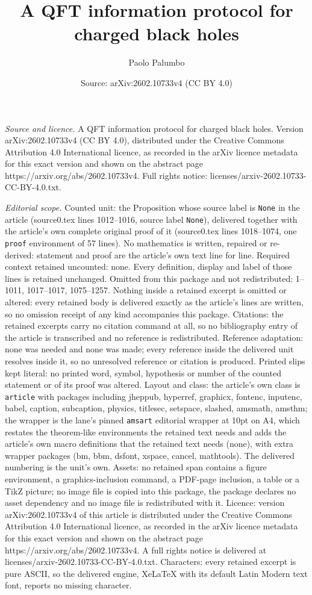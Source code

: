\documentclass[10pt,a4paper]{amsart}
\title[A QFT information protocol for charged black holes]{A QFT information protocol for charged black holes}
\author{Paolo Palumbo}
\date{Source: arXiv:2602.10733v4 (CC BY 4.0)}
\begin{document}
\maketitle

\noindent\emph{Source and licence.} A QFT information protocol for charged black holes. Version arXiv:2602.10733v4 (CC BY 4.0), distributed under the Creative Commons Attribution 4.0 International licence, as recorded in the arXiv licence metadata for this exact version and shown on the abstract page https://arxiv.org/abs/2602.10733v4. Full rights notice: licenses/arxiv-2602.10733-CC-BY-4.0.txt.\par\smallskip

\noindent\textit{Editorial scope.} Counted unit: the Proposition whose source label is \texttt{None} in the article (source0.tex lines 1012--1016, source label \texttt{None}), delivered together with the article's own complete original proof of it (source0.tex lines 1018--1074, one \texttt{proof} environment of 57 lines). No mathematics is written, repaired or re-derived: statement and proof are the article's own text line for line. Required context retained uncounted: none. Every definition, display and label of those lines is retained unchanged. Omitted from this package and not redistributed: 1--1011, 1017--1017, 1075--1257. Nothing inside a retained excerpt is omitted or altered: every retained body is delivered exactly as the article's lines are written, so no omission receipt of any kind accompanies this package. Citations: the retained excerpts carry no citation command at all, so no bibliography entry of the article is transcribed and no reference is redistributed. Reference adaptation: none was needed and none was made; every reference inside the delivered unit resolves inside it, so no unresolved reference or citation is produced. Printed slips kept literal: no printed word, symbol, hypothesis or number of the counted statement or of its proof was altered. Layout and class: the article's own class is \texttt{article} with packages including jheppub, hyperref, graphicx, fontenc, inputenc, babel, caption, subcaption, physics, titlesec, setspace, slashed, amsmath, amsthm; the wrapper is the lane's pinned \texttt{amsart} editorial wrapper at 10pt on A4, which restates the theorem-like environments the retained text needs and adds the article's own macro definitions that the retained text needs (none), with extra wrapper packages (bm, bbm, dsfont, xspace, cancel, mathtools). The delivered numbering is the unit's own. Assets: no retained span contains a figure environment, a graphics-inclusion command, a PDF-page inclusion, a table or a TikZ picture; no image file is copied into this package, the package declares no asset dependency and no image file is redistributed with it. Licence: version arXiv:2602.10733v4 of this article is distributed under the Creative Commons Attribution 4.0 International licence, as recorded in the arXiv licence metadata for this exact version and shown on the abstract page https://arxiv.org/abs/2602.10733v4. A full rights notice is delivered at licenses/arxiv-2602.10733-CC-BY-4.0.txt. Characters: every retained excerpt is pure ASCII, so the delivered engine, XeLaTeX with its default Latin Modern text font, reports no missing character.
\end{document}
